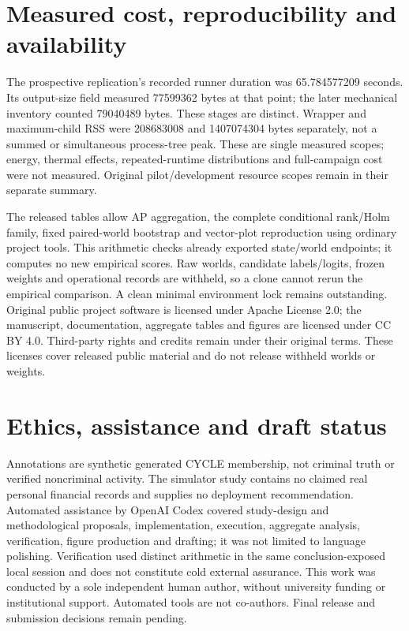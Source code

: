 \documentclass{article}
\begin{document}
\section{Measured cost, reproducibility and availability}

The prospective replication's recorded runner duration was 65.784577209 seconds. Its output-size field measured 77599362 bytes at that point; the later mechanical inventory counted 79040489 bytes. These stages are distinct. Wrapper and maximum-child RSS were 208683008 and 1407074304 bytes separately, not a summed or simultaneous process-tree peak. These are single measured scopes; energy, thermal effects, repeated-runtime distributions and full-campaign cost were not measured. Original pilot/development resource scopes remain in their separate summary.

The released tables allow AP aggregation, the complete conditional rank/Holm family, fixed paired-world bootstrap and vector-plot reproduction using ordinary project tools. This arithmetic checks already exported state/world endpoints; it computes no new empirical scores. Raw worlds, candidate labels/logits, frozen weights and operational records are withheld, so a clone cannot rerun the empirical comparison. A clean minimal environment lock remains outstanding. Original public project software is licensed under Apache License 2.0; the manuscript, documentation, aggregate tables and figures are licensed under CC BY 4.0. Third-party rights and credits remain under their original terms. These licenses cover released public material and do not release withheld worlds or weights.

\section{Ethics, assistance and draft status}

Annotations are synthetic generated CYCLE membership, not criminal truth or verified noncriminal activity. The simulator study contains no claimed real personal financial records and supplies no deployment recommendation. Automated assistance by OpenAI Codex covered study-design and methodological proposals, implementation, execution, aggregate analysis, verification, figure production and drafting; it was not limited to language polishing. Verification used distinct arithmetic in the same conclusion-exposed local session and does not constitute cold external assurance. This work was conducted by a sole independent human author, without university funding or institutional support. Automated tools are not co-authors. Final release and submission decisions remain pending.
\end{document}
